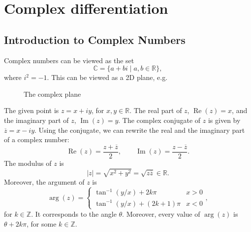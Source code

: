\documentclass[a4paper, openany]{memoir}
\theoremstyle{definition}
\theoremstyle{plain}
\begin{document}
\chapter{Complex differentiation}
\setcounter{section}{-1}
\section{Introduction to Complex Numbers}
Complex numbers can be viewed as the set
\[\mathbb{C} = \{a + bi \mid a, b \in \mathbb{R}\},\]
where $i^2 = -1$. This can be viewed as a 2D plane, e.g.
\begin{figure}[H]
    \centering
    \caption{The complex plane}
\end{figure}
\noindent The given point is $z = x + iy$, for $x, y \in \mathbb{R}$. The real part of $z$, $\operatorname{Re}(z) = x$, and the imaginary part of $z$, $\operatorname{Im}(z) = y$. The complex conjugate of $z$ is given by $\overline{z} = x - iy$. Using the conjugate, we can rewrite the real and the imaginary part of a complex number:
\[\operatorname{Re}(z) = \frac{z + \overline{z}}{2}, \qquad \operatorname{Im}(z) = \frac{z - \overline{z}}{2}.\]
The modulus of $z$ is
\[|z| = \sqrt{x^2 + y^2} = \sqrt{z \overline{z}} \in \mathbb{R}.\]
Moreover, the argument of $z$ is
\[\operatorname{arg}(z) = \begin{cases}
\tan^{-1}(y/x) + 2k\pi & x > 0 \\
\tan^{-1}(y/x) + (2k+1)\pi & x < 0 
\end{cases},\]
for $k \in \mathbb{Z}$. It corresponds to the angle $\theta$. Moreover, every value of $\arg (z)$ is $\theta + 2k \pi$, for some $k \in \mathbb{Z}$. 
\end{document}
